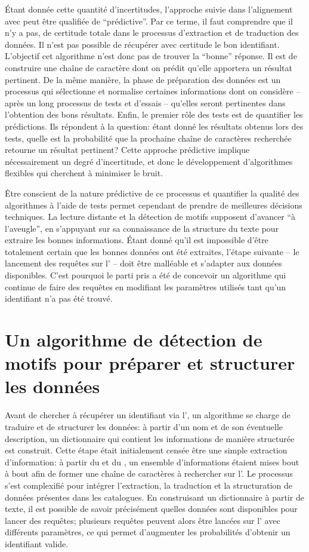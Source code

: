 Étant donnée cette quantité d'incertitudes, l'approche suivie dans l'alignement avec \wkd{} peut être qualifiée de \enquote{prédictive}. Par ce terme, il faut comprendre que il n'y a pas, de certitude totale dans le processus d'extraction et de traduction des données. Il n'est pas possible de récupérer avec certitude le bon identifiant. L'objectif cet algorithme n'est donc pas de trouver la \enquote{bonne} réponse. Il est de construire une chaîne de caractère dont on prédit qu'elle apportera un résultat pertinent. De la même manière, la phase de préparation des données est un processus qui sélectionne et normalise certaines informations dont on considère -- après un long processus de tests et d'essais -- qu'elles seront pertinentes dans l'obtention des bons résultats. Enfin, le premier rôle des tests est de quantifier les prédictions. Ils répondent à la question: étant donné les résultats obtenus lors des tests, quelle est la probabilité que la prochaine chaîne de caractères recherchée retourne un résultat pertinent? Cette approche prédictive implique nécessairement un degré d'incertitude, et donc le développement d'algorithmes flexibles qui cherchent à minimiser le bruit. 

Être conscient de la nature prédictive de ce processus et quantifier la qualité des algorithmes à l'aide de tests permet cependant de prendre de meilleures décisions techniques. La lecture distante et la détection de motifs supposent d'avancer \enquote{à l'aveugle}, en s'appuyant sur sa connaissance de la structure du texte pour extraire les bonnes informations. Étant donné qu'il est impossible d'être totalement certain que les bonnes données ont été extraites, l'étape suivante -- le lancement des requêtes sur l'\api{} -- doit être malléable et s'adapter aux données disponibles. C'est pourquoi le parti pris a été de concevoir un algorithme qui continue de faire des requêtes en modifiant les paramètres utilisés tant qu'un identifiant n'a pas été trouvé.

\chapter{Un algorithme de détection de motifs pour préparer et structurer les données}
Avant de chercher à récupérer un identifiant \wkd{} via l'\api{}, un algorithme se charge de traduire et de structurer les données: à partir d'un nom et de son éventuelle description, un dictionnaire qui contient les informations de manière structurée est construit. Cette étape était initialement censée être une simple extraction d'information: à partir du \tname{} et du \ttrait{}, un ensemble d'informations étaient mises bout à bout afin de former une chaîne de caractères à rechercher sur l'\api{}. Le processus s'est complexifié pour intégrer l'extraction, la traduction et la structuration de données présentes dans les catalogues. En construisant un \gls{dictionnaire} à partir de texte, il est possible de savoir précisément quelles données sont disponibles pour lancer des requêtes; plusieurs requêtes peuvent alors être lancées sur l'\api{} avec différents paramètres, ce qui permet d'augmenter les probabilités d'obtenir un identifiant valide. 

